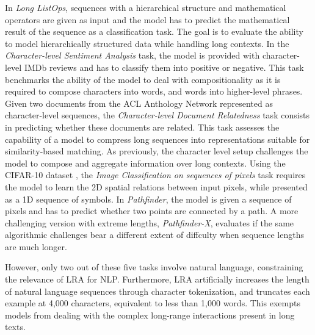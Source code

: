 In \textit{Long ListOps}, sequences with a hierarchical structure and mathematical operators are given as input and the model has to predict the mathematical result of the sequence as a classification task. The goal is to evaluate the ability to model hierarchically structured data while handling long contexts. 
In the \textit{Character-level Sentiment Analysis} task, the model is provided with character-level IMDb reviews \citep{maas2011learning} and has to classify them into positive or negative. This task benchmarks the ability of the model to deal with compositionality as it is required to compose characters into words, and words into higher-level phrases.
Given two documents from the ACL Anthology Network \citep{radev2013acl} represented as character-level sequences, the \textit{Character-level Document Relatedness} task consists in predicting whether these documents are related. This task assesses the capability of a model to compress long sequences into representations suitable for similarity-based matching. As previously, the character level setup challenges the model to compose and aggregate information over long contexts.
Using the CIFAR-10 dataset \citep{krizhevsky2009learning}, the \textit{Image Classification on sequences of pixels} task requires the model to learn the 2D spatial relations between input pixels, while presented as a 1D sequence of symbols.
In \textit{Pathfinder}, the model is given a sequence of pixels and has to predict whether two points are connected by a path. A more challenging version with extreme lengths, \textit{Pathfinder-X}, evaluates if the same algorithmic challenges bear a different extent of diffculty when sequence lengths are much longer.

However, only two out of these five tasks involve natural language, constraining the relevance of \ac{LRA} for \ac{NLP}. Furthermore, \ac{LRA} artificially increases the length of natural language sequences through character tokenization, and truncates each example at 4,000 characters, equivalent to less than 1,000 words. This exempts models from dealing with the complex long-range interactions present in long texts.

